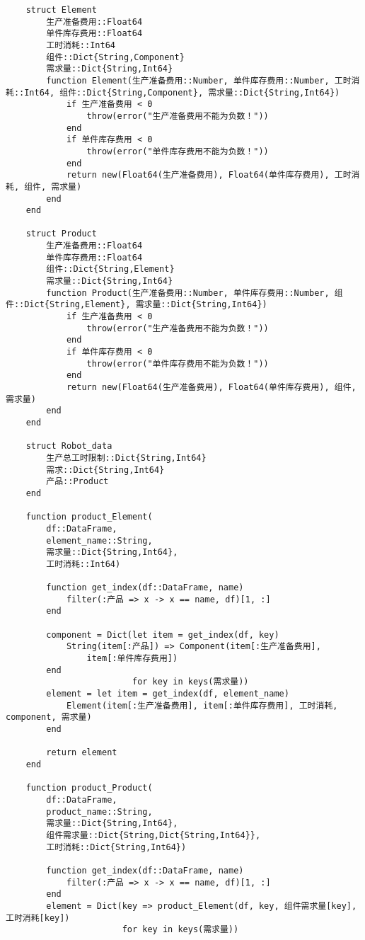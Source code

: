 \begin{appendices}
\begin{lstlisting}
    struct Element
        生产准备费用::Float64
        单件库存费用::Float64
        工时消耗::Int64
        组件::Dict{String,Component}
        需求量::Dict{String,Int64}
        function Element(生产准备费用::Number, 单件库存费用::Number, 工时消耗::Int64, 组件::Dict{String,Component}, 需求量::Dict{String,Int64})
            if 生产准备费用 < 0
                throw(error("生产准备费用不能为负数！"))
            end
            if 单件库存费用 < 0
                throw(error("单件库存费用不能为负数！"))
            end
            return new(Float64(生产准备费用), Float64(单件库存费用), 工时消耗, 组件, 需求量)
        end
    end

    struct Product
        生产准备费用::Float64
        单件库存费用::Float64
        组件::Dict{String,Element}
        需求量::Dict{String,Int64}
        function Product(生产准备费用::Number, 单件库存费用::Number, 组件::Dict{String,Element}, 需求量::Dict{String,Int64})
            if 生产准备费用 < 0
                throw(error("生产准备费用不能为负数！"))
            end
            if 单件库存费用 < 0
                throw(error("单件库存费用不能为负数！"))
            end
            return new(Float64(生产准备费用), Float64(单件库存费用), 组件, 需求量)
        end
    end

    struct Robot_data
        生产总工时限制::Dict{String,Int64}
        需求::Dict{String,Int64}
        产品::Product
    end

    function product_Element(
        df::DataFrame,
        element_name::String,
        需求量::Dict{String,Int64},
        工时消耗::Int64)

        function get_index(df::DataFrame, name)
            filter(:产品 => x -> x == name, df)[1, :]
        end

        component = Dict(let item = get_index(df, key)
            String(item[:产品]) => Component(item[:生产准备费用],
                item[:单件库存费用])
        end
                         for key in keys(需求量))
        element = let item = get_index(df, element_name)
            Element(item[:生产准备费用], item[:单件库存费用], 工时消耗, component, 需求量)
        end

        return element
    end

    function product_Product(
        df::DataFrame,
        product_name::String,
        需求量::Dict{String,Int64},
        组件需求量::Dict{String,Dict{String,Int64}},
        工时消耗::Dict{String,Int64})

        function get_index(df::DataFrame, name)
            filter(:产品 => x -> x == name, df)[1, :]
        end
        element = Dict(key => product_Element(df, key, 组件需求量[key], 工时消耗[key])
                       for key in keys(需求量))


\end{lstlisting}
\end{appendices}
